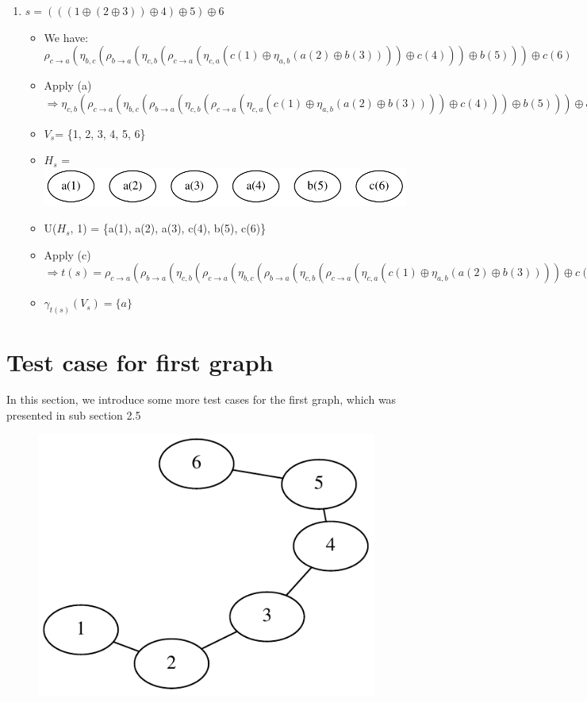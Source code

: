 \documentclass[a4paper, 12pt]{article}
\begin{document}
\begin{enumerate}
\item $s=(((1\oplus(2\oplus3))\oplus4)\oplus5)\oplus6$
\begin{itemize}
\item We have: $\rho_{c\rightarrow a}(\eta_{b,c}(\rho_{b\rightarrow a}(\eta_{c,b}(\rho_{c\rightarrow a}(\eta_{c,a}(c(1)\oplus\eta_{a,b}(a(2)\oplus b(3))))\oplus c(4)))\oplus b(5)))\oplus c(6)$
\item Apply (a) $\Longrightarrow\eta_{c,b}(\rho_{c\rightarrow a}(\eta_{b,c}(\rho_{b\rightarrow a}(\eta_{c,b}(\rho_{c\rightarrow a}(\eta_{c,a}(c(1)\oplus\eta_{a,b}(a(2)\oplus b(3))))\oplus c(4)))\oplus b(5)))\oplus c(6))$
\item {$V_s$}= \{1, 2, 3, 4, 5, 6\} 
\item {$H_s$} = \includegraphics[scale=0.5]{image/example7}
\item U({$H_s$}, 1) = \{a(1), a(2), a(3), c(4), b(5), c(6)\} 
\item Apply (c) $\Longrightarrow t(s)=\rho_{c\rightarrow a}(\rho_{b\rightarrow a}(\eta_{c,b}(\rho_{c\rightarrow a}(\eta_{b,c}(\rho_{b\rightarrow a}(\eta_{c,b}(\rho_{c\rightarrow a}(\eta_{c,a}(c(1)\oplus\eta_{a,b}(a(2)\oplus b(3))))\oplus c(4)))\oplus b(5)))\oplus c(6))))$ 
\item $\gamma_{t(s)}(V_{s})=\{a\}$ 
\end{itemize}
\end{enumerate}

\section{Test case for first graph}

In this section, we introduce some more test cases for the first graph, which was presented in sub section 2.5 \\

\begin{figure}[H]
\centering{}
\includegraphics{image/graph_example}
\end{figure}
\end{document}
